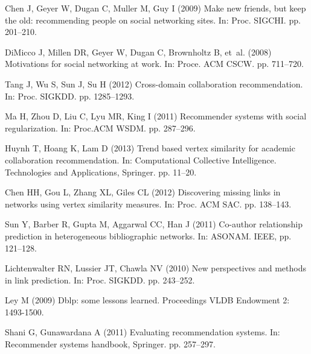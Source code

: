 \documentclass[10pt]{article}
\begin{document}
\begin{thebibliography}{10}
Chen J, Geyer W, Dugan C, Muller M, Guy I (2009) Make new friends, but keep the
  old: recommending people on social networking sites.
\newblock In: Proc. SIGCHI. pp. 201--210.

DiMicco J, Millen DR, Geyer W, Dugan C, Brownholtz B, et~al. (2008) Motivations
  for social networking at work.
\newblock In: Proce. ACM CSCW. pp. 711--720.

Tang J, Wu S, Sun J, Su H (2012) Cross-domain collaboration recommendation.
\newblock In: Proc. SIGKDD. pp. 1285--1293.

Ma H, Zhou D, Liu C, Lyu MR, King I (2011) Recommender systems with social
  regularization.
\newblock In: Proc.ACM WSDM. pp. 287--296.

Huynh T, Hoang K, Lam D (2013) Trend based vertex similarity for academic
  collaboration recommendation.
\newblock In: Computational Collective Intelligence. Technologies and
  Applications, Springer. pp. 11--20.

Chen HH, Gou L, Zhang XL, Giles CL (2012) Discovering missing links in networks
  using vertex similarity measures.
\newblock In: Proc. ACM SAC. pp. 138--143.

Sun Y, Barber R, Gupta M, Aggarwal CC, Han J (2011) Co-author relationship
  prediction in heterogeneous bibliographic networks.
\newblock In: ASONAM. IEEE, pp. 121--128.

Lichtenwalter RN, Lussier JT, Chawla NV (2010) New perspectives and methods in
  link prediction.
\newblock In: Proc. SIGKDD. pp. 243--252.

Ley M (2009) Dblp: some lessons learned.
\newblock Proceedings VLDB Endowment 2: 1493-1500.

Shani G, Gunawardana A (2011) Evaluating recommendation systems.
\newblock In: Recommender systems handbook, Springer. pp. 257--297.

\end{thebibliography}
\end{document}

